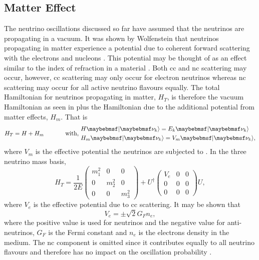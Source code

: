 \subsection{Matter Effect}
The neutrino oscillations discussed so far have assumed that the neutrinos are propagating in a vacuum. It was shown by Wolfenstein that neutrinos propagating in matter experience a potential due to coherent forward scattering with the electrons and nucleons \cite{Wolfenstein}. This potential may be thought of as an effect similar to the index of refraction in a material \cite{Fundamentals_of_Neutrino_Physics_and_Astrophysics}. Both \gls{cc} and \gls{nc} scattering may occur, however, \gls{cc} scattering may only occur for electron neutrinos whereas \gls{nc} scattering may occur for all active neutrino flavours equally. The total Hamiltonian for neutrinos propagating in matter, $H_T$, is therefore the vacuum Hamiltonian as seen in  plus the Hamiltonian due to the additional potential from matter effects, $H_m$. That is 
\begin{equation}
    H_T = H + H_m \text{ \hspace{1cm} with, } \begin{split}
        & H\ket{\nu_k} = E_k\ket{\nu_k} \\
        & H_m\ket{\nu_k} = V_m\ket{\nu_k},
    \end{split}
\end{equation} 
where $V_m$ is the effective potential the neutrinos are subjected to \cite{Fundamentals_of_Neutrino_Physics_and_Astrophysics}. In the three neutrino mass basis,
\begin{equation}
H_T = \frac{1}{2E} 
\begin{pmatrix}
m_1^2 & 0 & 0 \\
0 & m_2^2 & 0 \\
0 & 0 & m_3^2
\end{pmatrix}
+ U^\dag
\begin{pmatrix}
V_e & 0 & 0 \\
0 & 0 & 0 \\
0 & 0 & 0
\end{pmatrix}
U,
\end{equation}
where $V_e$ is the effective potential due to \gls{cc} scattering. It may be shown that 
\begin{equation}
    V_e = \pm \sqrt{2}G_Fn_e,
\end{equation}
where the positive value is used for neutrinos and the negative value for anti-neutrinos, $G_F$ is the Fermi constant and $n_e$ is the electrons density in the medium.
The \gls{nc} component is omitted since it contributes equally to all neutrino flavours and therefore has no impact on the oscillation probability \cite{PDG_2022}. 

